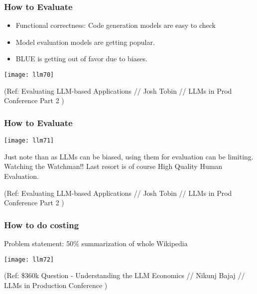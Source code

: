 \begin{frame}[fragile]\frametitle{How to Evaluate}

\begin{itemize}
\item Functional correctness: Code generation models are easy to check
\item Model evaluation models are getting popular.
\item BLUE is getting out of favor due to biases.
\end{itemize}

\begin{center}
\texttt{[image: llm70]}
\end{center}		


{\tiny (Ref: Evaluating LLM-based Applications // Josh Tobin // LLMs in Prod Conference Part 2 )}

\end{frame}

\begin{frame}[fragile]\frametitle{How to Evaluate}


\begin{center}
\texttt{[image: llm71]}
\end{center}		

Just note than as LLMs can be biased, using them for evaluation can be limiting. Watching the Watchman!!
Last resort is of course High Quality Human Evaluation.

{\tiny (Ref: Evaluating LLM-based Applications // Josh Tobin // LLMs in Prod Conference Part 2 )}

\end{frame}

\begin{frame}[fragile]\frametitle{How to do costing}

Problem statement: 50\% summarization of whole Wikipedia

\begin{center}
\texttt{[image: llm72]}
\end{center}		



{\tiny (Ref: \$360k Question - Understanding the LLM Economics // Nikunj Bajaj // LLMs in Production Conference )}

\end{frame}

